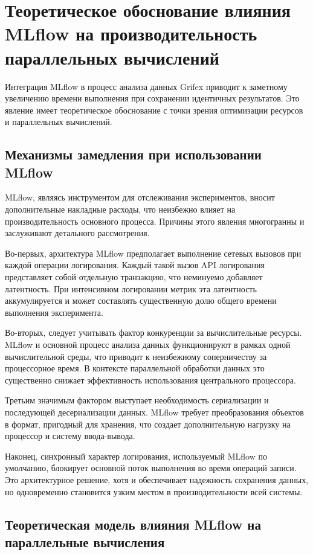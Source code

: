 \section{Теоретическое обоснование влияния MLflow на производительность параллельных вычислений}

Интеграция MLflow в процесс анализа данных Grifex приводит к заметному увеличению времени выполнения при сохранении идентичных результатов. Это явление имеет теоретическое обоснование с точки зрения оптимизации ресурсов и параллельных вычислений.

\subsection{Механизмы замедления при использовании MLflow}

MLflow, являясь инструментом для отслеживания экспериментов, вносит дополнительные накладные расходы, что неизбежно влияет на производительность основного процесса. Причины этого явления многогранны и заслуживают детального рассмотрения.

Во-первых, архитектура MLflow предполагает выполнение сетевых вызовов при каждой операции логирования. Каждый такой вызов API логирования представляет собой отдельную транзакцию, что неминуемо добавляет латентность. При интенсивном логировании метрик эта латентность аккумулируется и может составлять существенную долю общего времени выполнения эксперимента.

Во-вторых, следует учитывать фактор конкуренции за вычислительные ресурсы. MLflow и основной процесс анализа данных функционируют в рамках одной вычислительной среды, что приводит к неизбежному соперничеству за процессорное время. В контексте параллельной обработки данных это существенно снижает эффективность использования центрального процессора.

Третьим значимым фактором выступает необходимость сериализации и последующей десериализации данных. MLflow требует преобразования объектов в формат, пригодный для хранения, что создает дополнительную нагрузку на процессор и систему ввода-вывода.

Наконец, синхронный характер логирования, используемый MLflow по умолчанию, блокирует основной поток выполнения во время операций записи. Это архитектурное решение, хотя и обеспечивает надежность сохранения данных, но одновременно становится узким местом в производительности всей системы.

\subsection{Теоретическая модель влияния MLflow на параллельные вычисления}


